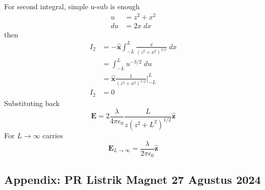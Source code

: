 \documentclass[../../../main.tex]{subfiles}
\begin{document}
For second integral, simple u-sub is enough
\begin{align*}
    u&=z^2+x^2\\
    du&= 2x\;dx
\end{align*}
then\begin{align*}
    I_2&=- \mathbf{\hat{x}} \int_{-L}^{L} \frac{x}{(z^2+x^2)^{3/2}}\;dx\\
    &=\int_{-L}^{L} u^{-3/2}\;du\\
    &=\mathbf{\hat{x}}\frac{1 }{(z^2+x^2)^{1/2}} \bigg|_{-L}^{L}\\
    I_2&=0
\end{align*}
Substituting back
\begin{equation*}
    \mathbf{E}=2 \frac{\lambda}{4\pi\epsilon_0}\frac{L}{z(z^2+L^2)^{1/2}}\mathbf{\hat{z}}
\end{equation*}
For $L\rightarrow\infty$ carries\begin{equation*}
    \mathbf{E}_{L\rightarrow\infty}=\frac{\lambda}{2\pi \epsilon_0}\mathbf{\hat{z}}
\end{equation*}

\subsection*{Appendix: PR Listrik Magnet 27 Agustus 2024}
\end{document}
